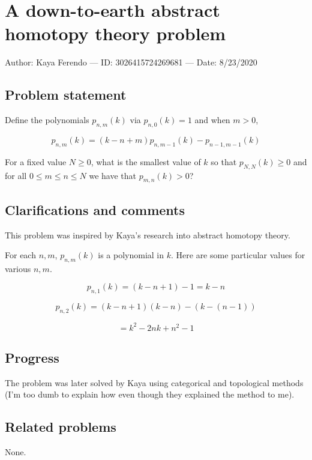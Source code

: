 
\section{A down-to-earth abstract homotopy theory problem}

Author: Kaya Ferendo --- ID: 3026415724269681 --- Date: 8/23/2020

\subsection{Problem statement}

Define the polynomials $p_{n,m}(k)$ via $p_{n,0}(k)=1$ and when $m>0$,

$$p_{n,m}(k)=(k-n+m)p_{n,m-1}(k)-p_{n-1,m-1}(k)$$

For a fixed value $N\geq 0$, what is the smallest value of $k$ so that $p_{N,N}(k)\geq 0$ and for all $0\leq m\leq n\leq N$ we have that $p_{m,n}(k)>0$?

\subsection{Clarifications and comments}

This problem was inspired by Kaya's research into abstract homotopy theory.

For each $n,m$, $p_{n,m}(k)$ is a polynomial in $k$. Here are some particular values for various $n,m$.

$$p_{n,1}(k)=(k-n+1)-1=k-n$$

$$p_{n,2}(k)=(k-n+1)(k-n)-(k-(n-1))$$

$$=k^2-2nk+n^2-1$$

\subsection{Progress}

The problem was later solved by Kaya using categorical and topological methods (I'm too dumb to explain how even though they explained the method to me).

\subsection{Related problems}

None.

